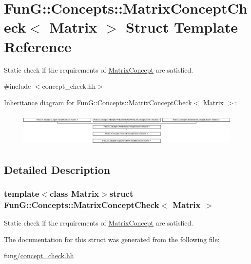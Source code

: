 \hypertarget{structFunG_1_1Concepts_1_1MatrixConceptCheck}{\section{Fun\-G\-:\-:Concepts\-:\-:Matrix\-Concept\-Check$<$ Matrix $>$ Struct Template Reference}
\label{structFunG_1_1Concepts_1_1MatrixConceptCheck}
}


Static check if the requirements of \hyperlink{structFunG_1_1Concepts_1_1MatrixConcept}{Matrix\-Concept} are satisfied.  




{\ttfamily \#include $<$concept\-\_\-check.\-hh$>$}

Inheritance diagram for Fun\-G\-:\-:Concepts\-:\-:Matrix\-Concept\-Check$<$ Matrix $>$\-:\begin{figure}[H]
\begin{center}
\leavevmode
\includegraphics[height=1.728395cm]{structFunG_1_1Concepts_1_1MatrixConceptCheck}
\end{center}
\end{figure}


\subsection{Detailed Description}
\subsubsection*{template$<$class Matrix$>$struct Fun\-G\-::\-Concepts\-::\-Matrix\-Concept\-Check$<$ Matrix $>$}

Static check if the requirements of \hyperlink{structFunG_1_1Concepts_1_1MatrixConcept}{Matrix\-Concept} are satisfied. 

The documentation for this struct was generated from the following file\-:\begin{DoxyCompactItemize}
\item 
fung/\hyperlink{concept__check_8hh}{concept\-\_\-check.\-hh}\end{DoxyCompactItemize}
